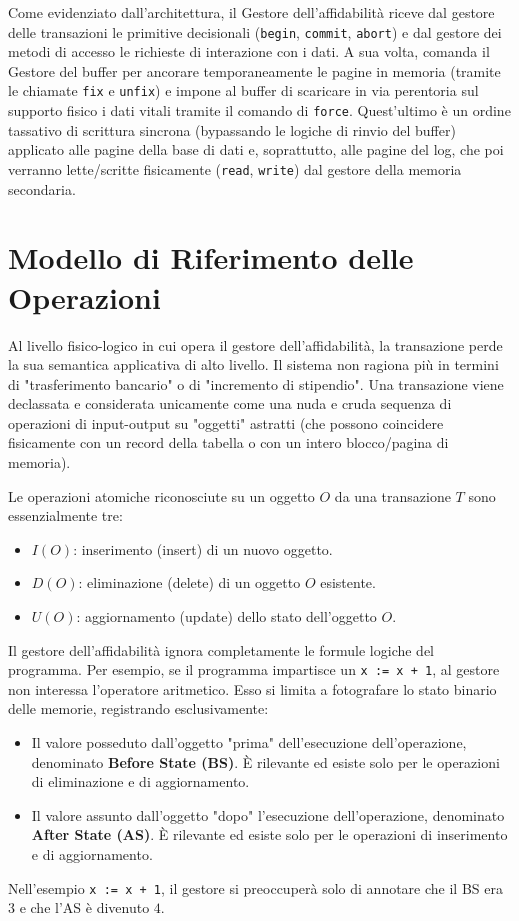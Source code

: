 Come evidenziato dall'architettura, il Gestore dell'affidabilità riceve dal gestore delle transazioni le primitive decisionali (\texttt{begin}, \texttt{commit}, \texttt{abort}) e dal gestore dei metodi di accesso le richieste di interazione con i dati. A sua volta, comanda il Gestore del buffer per ancorare temporaneamente le pagine in memoria (tramite le chiamate \texttt{fix} e \texttt{unfix}) e impone al buffer di scaricare in via perentoria sul supporto fisico i dati vitali tramite il comando di \texttt{force}. Quest'ultimo è un ordine tassativo di scrittura sincrona (bypassando le logiche di rinvio del buffer) applicato alle pagine della base di dati e, soprattutto, alle pagine del log, che poi verranno lette/scritte fisicamente (\texttt{read}, \texttt{write}) dal gestore della memoria secondaria.

\section{Modello di Riferimento delle Operazioni}

Al livello fisico-logico in cui opera il gestore dell'affidabilità, la transazione perde la sua semantica applicativa di alto livello. Il sistema non ragiona più in termini di "trasferimento bancario" o di "incremento di stipendio". Una transazione viene declassata e considerata unicamente come una nuda e cruda sequenza di operazioni di input-output su "oggetti" astratti (che possono coincidere fisicamente con un record della tabella o con un intero blocco/pagina di memoria).

Le operazioni atomiche riconosciute su un oggetto $O$ da una transazione $T$ sono essenzialmente tre:
\begin{itemize}
    \item $I(O)$: inserimento (insert) di un nuovo oggetto.
    \item $D(O)$: eliminazione (delete) di un oggetto $O$ esistente.
    \item $U(O)$: aggiornamento (update) dello stato dell'oggetto $O$.
\end{itemize}

Il gestore dell'affidabilità ignora completamente le formule logiche del programma. Per esempio, se il programma impartisce un \texttt{x := x + 1}, al gestore non interessa l'operatore aritmetico. Esso si limita a fotografare lo stato binario delle memorie, registrando esclusivamente:
\begin{itemize}
    \item Il valore posseduto dall'oggetto "prima" dell'esecuzione dell'operazione, denominato \textbf{Before State (BS)}. È rilevante ed esiste solo per le operazioni di eliminazione e di aggiornamento.
    \item Il valore assunto dall'oggetto "dopo" l'esecuzione dell'operazione, denominato \textbf{After State (AS)}. È rilevante ed esiste solo per le operazioni di inserimento e di aggiornamento.
\end{itemize}
Nell'esempio \texttt{x := x + 1}, il gestore si preoccuperà solo di annotare che il BS era $3$ e che l'AS è divenuto $4$.

